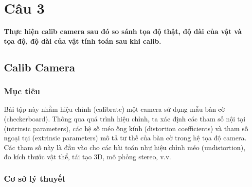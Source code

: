 \section{Câu 3}
     \hspace*{0.6cm}\textbf{Thực hiện calib camera sau đó so sánh tọa độ thật, độ dài của vật và tọa độ, độ dài của vật tính toán sau khi calib.}
     \subsection{Calib Camera}
          \subsubsection{Mục tiêu}
          \hspace*{0.6cm}Bài tập này nhằm hiệu chỉnh (calibrate) một camera sử dụng mẫu bàn cờ (checkerboard). Thông qua quá trình hiệu chỉnh, ta xác định các tham số nội tại (intrinsic parameters), các hệ số méo ống kính (distortion coefficients) và tham số ngoại tại (extrinsic parameters) mô tả tư thế của bàn cờ trong hệ tọa độ camera. Các tham số này là đầu vào cho các bài toán như hiệu chỉnh méo (undistortion), đo kích thước vật thể, tái tạo 3D, mô phỏng stereo, v.v.

          \subsubsection{Cơ sở lý thuyết}

